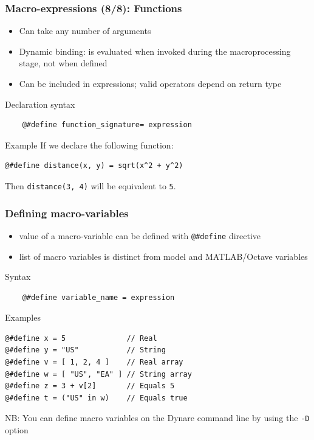 \documentclass[handout,usepdftitle=false,xcolor=dvipsnames,aspectratio=169]{beamer}
\begin{document}
\begin{frame}[fragile]
  \frametitle{Macro-expressions (8/8): Functions}
  \begin{itemize}
    \item Can take any number of arguments
    \item Dynamic binding: is evaluated when invoked during the macroprocessing stage, not when defined
    \item Can be included in expressions; valid operators depend on return type
  \end{itemize}

  \begin{block}{Declaration syntax}
    \begin{verbatim}
    @#define function_signature= expression
    \end{verbatim}
  \end{block}

  \begin{block}{Example}
    If we declare the following function:
    \begin{verbatim}
@#define distance(x, y) = sqrt(x^2 + y^2)
\end{verbatim}
    Then \texttt{distance(3, 4)} will be equivalent to \texttt{5}.
  \end{block}
\end{frame}

\begin{frame}[fragile]
  \frametitle{Defining macro-variables}

  \begin{itemize}
    \item value of a macro-variable can be defined with \verb+@#define+
          directive
    \item list of macro variables is distinct from model and MATLAB/Octave variables
  \end{itemize}

  \begin{block}{Syntax}
    \small
    \begin{verbatim}
    @#define variable_name = expression
  \end{verbatim}
  \end{block}

  \begin{block}{Examples}
    \small
    \begin{verbatim}
@#define x = 5              // Real
@#define y = "US"           // String
@#define v = [ 1, 2, 4 ]    // Real array
@#define w = [ "US", "EA" ] // String array
@#define z = 3 + v[2]       // Equals 5
@#define t = ("US" in w)    // Equals true
\end{verbatim}
  \end{block}
  NB: You can define macro variables on the Dynare command line by using the \texttt{-D} option
\end{frame}
\end{document}
